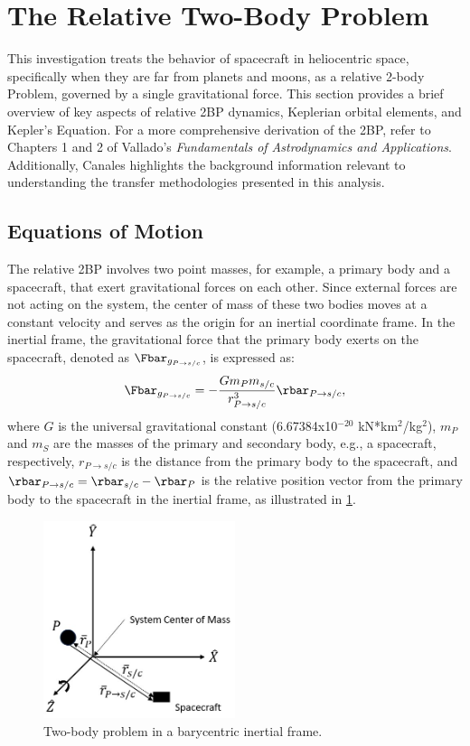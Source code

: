 \section{The Relative Two-Body Problem}\label{sec:Relative2BP}
This investigation treats the behavior of spacecraft in heliocentric space, specifically when they
are far from planets and moons, as a relative 2-body Problem, governed by a single gravitational
force. This section provides a brief overview of key aspects of relative 2BP dynamics, Keplerian
orbital elements, and Kepler's Equation. For a more comprehensive derivation of the 2BP, refer to
Chapters 1 and 2 of Vallado's \emph{Fundamentals of Astrodynamics and
Applications}\cite{Vallado:2013}. Additionally, Canales highlights the background information
relevant to understanding the transfer methodologies presented in this
analysis\cite{Canales:2021b}.

\subsection{Equations of Motion}
The relative 2BP involves two point masses, for example, a primary body and a spacecraft, that
exert gravitational forces on each other. Since external forces are not acting on the system, the
center of mass of these two bodies moves at a constant velocity and serves as the origin for an
inertial coordinate frame. In the inertial frame, the gravitational force that the primary body
exerts on the spacecraft, denoted as $\Fbar_{g_{P\rightarrow s/c}}$, is expressed as:
\begin{equation}
    \Fbar_{g_{P\rightarrow s/c}}=-\frac{Gm_{P}m_{s/c}}{r_{P\rightarrow s/c}^{3}}\rbar_{P\rightarrow s/c},
    \label{eq:gravity}
\end{equation}
where $G$ is the universal gravitational constant (6.67384x10$^{-20}$ kN*km$^{2}$/kg$^{2}$),
$m_{P}$ and $m_{S}$ are the masses of the primary and secondary body, e.g., a spacecraft,
respectively, $r_{P\rightarrow s/c}$ is the distance from the primary body to the spacecraft, and
$\rbar_{P\rightarrow s/c}=\rbar_{s/c}-\rbar_{P}$ is the relative position vector from the primary
body to the spacecraft in the inertial frame, as illustrated in \cref{fig:2BP}.

\begin{figure}[H]
    \centering
    \includegraphics[width=0.5\textwidth]{figures/TBP.jpg}
    \caption{Two-body problem in a barycentric inertial frame.}
    \label{fig:2BP}
\end{figure}


